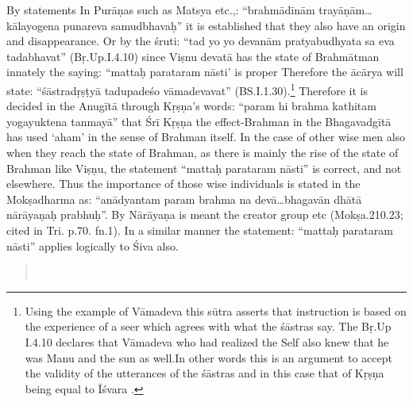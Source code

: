 By statements In Purāṇas such as Matsya etc.,: “brahmādīnām trayāṇām…kālayogena punareva samudbhavaḥ” it is established that they also have an origin and disappearance. Or by the śruti: “tad yo yo devanām pratyabudhyata sa eva tadabhavat” (Bṛ.Up.I.4.10)  since Viṣnu devatā has the state of Brahmātman innately the saying: “mattaḥ parataram nāsti’ is proper Therefore the ācārya will state: “śāstradṛṣṭyā tadupadeśo vāmadevavat” (BS.I.1.30).\footnote{Using the example of Vāmadeva this sūtra asserts that instruction is based on the experience of a seer which agrees with what the śāstras say. The Bṛ.Up I.4.10 declares that Vāmadeva who had realized the Self also knew that he was Manu and the sun as well.In other words this is an argument to accept the validity of the utterances of the śāstras and in this case that of Kṛṣṇa being equal to Īśvara .} Therefore it is decided in the Anugītā through Kṛṣṇa’s words: “param hi brahma kathitam yogayuktena tanmayā” that Śrī Kṛṣṇa the effect-Brahman in the Bhagavadgītā has used ‘aham’ in the sense of Brahman itself. In the case of other wise men also when they reach the state of Brahman, as there is mainly the rise of the state of Brahman like Viṣṇu, the statement “mattaḥ parataram nāsti” is correct, and not elsewhere. Thus the importance of those wise individuals is stated in the Mokṣadharma as: “anādyantam param brahma na devā…bhagavān dhātā nārāyaṇaḥ prabhuḥ”. By Nārāyaṇa is meant the creator group etc (Mokṣa.210.23; cited in Tri. p.70. fn.1). In a similar manner the statement: “mattaḥ parataram nāsti” applies logically to Śiva also.


\begin{verse}
\\
\end{verse}

